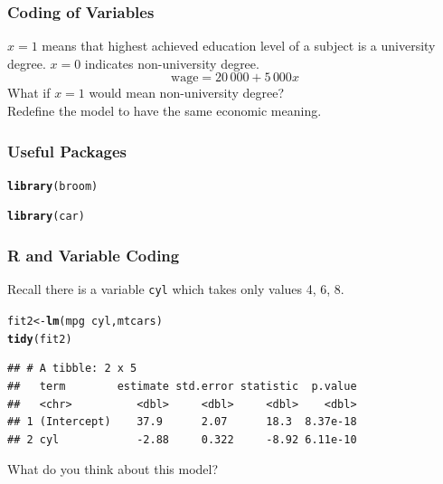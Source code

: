 \documentclass[12pt]{beamer}\usepackage[]{graphicx}\usepackage[]{color}
\makeatletter
\newcommand{\hlopt}[1]{\textcolor[rgb]{0,0,0}{#1}}%
\newcommand{\hlstd}[1]{\textcolor[rgb]{0.345,0.345,0.345}{#1}}%
\newcommand{\hlkwb}[1]{\textcolor[rgb]{0.69,0.353,0.396}{#1}}%
\newcommand{\hlkwd}[1]{\textcolor[rgb]{0.737,0.353,0.396}{\textbf{#1}}}%
\newenvironment{kframe}{%
 \def\at@end@of@kframe{}%
 \ifinner\ifhmode%
  \def\at@end@of@kframe{\end{minipage}}%
  \begin{minipage}{\columnwidth}%
 \fi\fi%
 \def\FrameCommand##1{\hskip\@totalleftmargin \hskip-\fboxsep
 \colorbox{shadecolor}{##1}\hskip-\fboxsep
     \hskip-\linewidth \hskip-\@totalleftmargin \hskip\columnwidth}%
 \MakeFramed {\advance\hsize-\width
   \@totalleftmargin\z@ \linewidth\hsize
   \@setminipage}}%
 {\par\unskip\endMakeFramed%
 \at@end@of@kframe}
\newenvironment{knitrout}{}{} %
\makeatother
\begin{document}
\begin{frame}\large
\frametitle{Coding of Variables}

$x=1$ means that highest achieved education level of a subject is a university degree. $x=0$ indicates non-university degree.
%
\begin{equation}
 \text{wage} = 20\,000 + 5\,000x \nonumber
\end{equation}
%
What if $x=1$ would mean non-university degree? \\[.4cm]

 Redefine the model to have the same economic meaning.
\end{frame}


\begin{frame}
\frametitle{Useful Packages}
\begin{knitrout}
\color{fgcolor}\begin{kframe}
\begin{alltt}
\hlkwd{library}\hlstd{(broom)}

\hlkwd{library}\hlstd{(car)}
\end{alltt}
\end{kframe}
\end{knitrout}

\end{frame}


\begin{frame}[fragile]
\frametitle{R and Variable Coding}
Recall there is a variable \texttt{cyl} which takes only values  4, 6, 8. 


\begin{knitrout}\small
{}\color{fgcolor}\begin{kframe}
\begin{alltt}
\hlstd{fit2} \hlkwb{<-} \hlkwd{lm}\hlstd{(mpg} \hlopt{~} \hlstd{cyl, mtcars)}
\hlkwd{tidy}\hlstd{(fit2)}
\end{alltt}
\begin{verbatim}
## # A tibble: 2 x 5
##   term        estimate std.error statistic  p.value
##   <chr>          <dbl>     <dbl>     <dbl>    <dbl>
## 1 (Intercept)    37.9      2.07      18.3  8.37e-18
## 2 cyl            -2.88     0.322     -8.92 6.11e-10
\end{verbatim}
\end{kframe}
\end{knitrout}

What do you think about this model?
\end{frame}
\end{document}
